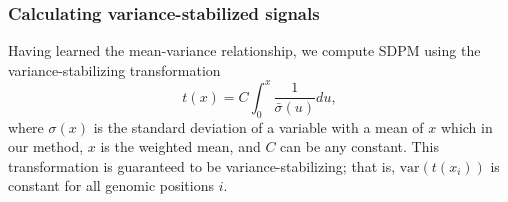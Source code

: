 \documentclass[11pt]{article}
\begin{document}
\subsubsection{Calculating variance-stabilized signals}
Having learned the mean-variance relationship, we compute SDPM using the variance-stabilizing transformation \cite{durbin2002variance}
\begin{equation}
  t(x) = C \int_{0}^{x}\frac 1 {\bar \sigma(u)} du ,
\end{equation}
where $\sigma(x)$ is the standard deviation of a variable with a mean of $x$ which in our method, $x$ is the weighted mean, and $C$ can be any constant. 
This transformation is guaranteed to be variance-stabilizing; that is, $\text{var}(t(x_i))$ is constant for all genomic positions $i$.




\end{document}
